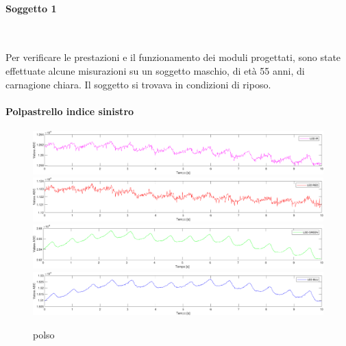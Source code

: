 \paragraph{Soggetto 1}~

Per verificare le prestazioni e il funzionamento dei moduli progettati, sono state effettuate alcune misurazioni su un soggetto maschio, di età 55 anni, di carnagione chiara. Il soggetto si trovava in condizioni di riposo.

\paragraph{Polpastrello indice sinistro}
\begin{figure}[tbh]
	\centering
	\includegraphics[width=0.8\linewidth]{ImageFiles/Misure Preliminari/Soggetto 1/polso_ired}
	\includegraphics[width=0.8\linewidth]{ImageFiles/Misure Preliminari/Soggetto 1/polso_red}
	\includegraphics[width=0.8\linewidth]{ImageFiles/Misure Preliminari/Soggetto 1/polso_green}
	\includegraphics[width=0.8\linewidth]{ImageFiles/Misure Preliminari/Soggetto 1/polso_blu}
	\caption{polso}
	\label{fig:Descrizione_Segnale_PPG}
\end{figure}
